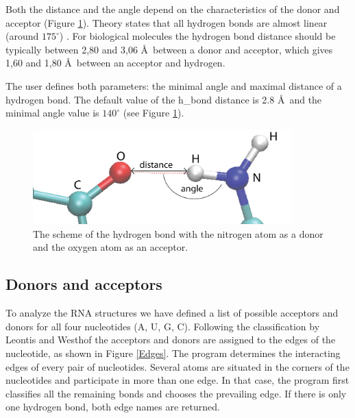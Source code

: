 \documentclass[12pt]{article}
\begin{document}
Both the distance and the angle depend on the characteristics of the donor and acceptor (Figure \ref{hbond}). Theory states that all hydrogen bonds are almost linear (around $175^\circ$) \cite{Guerra2000}. For biological molecules the hydrogen bond distance should be typically between 2,80 and 3,06 \AA\ between a donor and acceptor, which gives 1,60 and 1,80 \AA\ between an acceptor and hydrogen.

The user defines both parameters: the minimal angle and maximal distance of a hydrogen bond. The default value of the h\_bond distance is 2.8 \AA\ and the minimal angle value is $140^\circ$ (see Figure \ref{hbond}).


\begin{figure}[h!]
\centering
\includegraphics[width = 10cm]{./pictures/hydrogen_bond.png}
\caption{The scheme of the hydrogen bond with the nitrogen atom as a donor and the oxygen atom as an acceptor.}
\label{hbond}
\end{figure}

\subsection{Donors and acceptors}
To analyze the RNA structures we have defined a list of possible acceptors and donors for all four nucleotides (A, U, G, C). Following the classification by Leontis and Westhof \cite{Leontis2002} the acceptors and donors are assigned to the edges of the nucleotide, as shown in  Figure \ref{Edges}. The program determines the interacting edges of every pair of nucleotides. Several atoms are situated in the corners of the nucleotides and participate in more than one edge. In that case, the program first classifies all the remaining bonds and chooses the prevailing edge. If there is only one hydrogen bond, both edge names are returned. 
\end{document}
